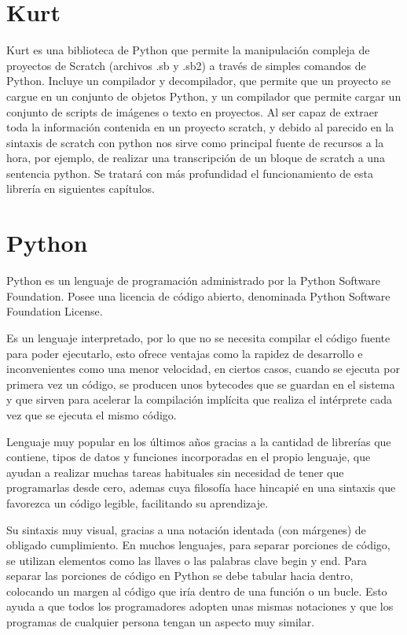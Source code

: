 \section{Kurt}
\label{sec:kurt}

Kurt es una biblioteca de Python que permite la manipulación compleja de proyectos de Scratch (archivos .sb y .sb2) a través de simples comandos de Python. Incluye un compilador y decompilador, que permite que un proyecto se cargue en un conjunto de objetos Python, y un compilador que permite cargar un conjunto de scripts de imágenes o texto en proyectos.
Al ser capaz de extraer toda la información contenida en un proyecto scratch, y debido al parecido en la sintaxis de scratch con python nos sirve como principal fuente de recursos a la hora, por ejemplo, de realizar una transcripción de un bloque de scratch a una sentencia python.
Se tratará con más profundidad el funcionamiento de esta librería en siguientes capítulos.


\section{Python}
\label{sec:python}
 
Python es un lenguaje de programación administrado por la Python Software Foundation. Posee una licencia de código abierto, denominada Python Software Foundation License.

Es un lenguaje interpretado, por lo que no se necesita compilar el código fuente para poder ejecutarlo, esto ofrece ventajas como la rapidez de desarrollo e inconvenientes como una menor velocidad, en ciertos casos, cuando se ejecuta por primera vez un código, se producen unos bytecodes que se guardan en el sistema y que sirven para acelerar la compilación implícita que realiza el intérprete cada vez que se ejecuta el mismo código. 

Lenguaje muy popular en los últimos años gracias a la cantidad de librerías que contiene, tipos de datos y funciones incorporadas en el propio lenguaje, que ayudan a realizar muchas tareas habituales sin necesidad de tener que programarlas desde cero, ademas cuya filosofía hace hincapié en una sintaxis que favorezca un código legible, facilitando su aprendizaje.

Su sintaxis muy visual, gracias a una notación identada (con márgenes) de obligado cumplimiento. En muchos lenguajes, para separar porciones de código, se utilizan elementos como las llaves o las palabras clave begin y end. Para separar las porciones de código en Python se debe tabular hacia dentro, colocando un margen al código que iría dentro de una función o un bucle. Esto ayuda a que todos los programadores adopten unas mismas notaciones y que los programas de cualquier persona tengan un aspecto muy similar. 

